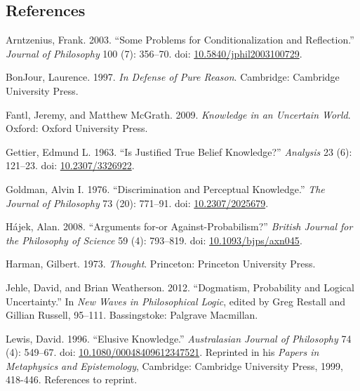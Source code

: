 \documentclass[
  10pt,
  letterpaper,
  DIV=11,
  numbers=noendperiod,
  twoside]{scrartcl}
\newlength{\cslhangindent}
\newenvironment{CSLReferences}[2] %
 {\begin{list}{}{%
  \setlength{\itemindent}{0pt}
  \setlength{\leftmargin}{0pt}
  \setlength{\parsep}{0pt}
  \ifodd #1
   \setlength{\leftmargin}{\cslhangindent}
   \setlength{\itemindent}{-1\cslhangindent}
  \fi
  \setlength{\itemsep}{#2\baselineskip}}}
 {\end{list}}
\begin{document}
\subsection*{References}\label{references}

\label{refs}
\begin{CSLReferences}{1}{0}
Arntzenius, Frank. 2003. {``Some Problems for Conditionalization and
Reflection.''} \emph{Journal of Philosophy} 100 (7): 356--70. doi:
\href{https://doi.org/10.5840/jphil2003100729}{10.5840/jphil2003100729}.

BonJour, Laurence. 1997. \emph{In Defense of Pure Reason}. Cambridge:
Cambridge University Press.

Fantl, Jeremy, and Matthew McGrath. 2009. \emph{Knowledge in an
Uncertain World}. Oxford: Oxford University Press.

Gettier, Edmund L. 1963. {``Is Justified True Belief Knowledge?''}
\emph{Analysis} 23 (6): 121--23. doi:
\href{https://doi.org/10.2307/3326922}{10.2307/3326922}.

Goldman, Alvin I. 1976. {``Discrimination and Perceptual Knowledge.''}
\emph{The Journal of Philosophy} 73 (20): 771--91. doi:
\href{https://doi.org/10.2307/2025679}{10.2307/2025679}.

Hájek, Alan. 2008. {``Arguments for-or Against-Probabilism?''}
\emph{British Journal for the Philosophy of Science} 59 (4): 793--819.
doi: \href{https://doi.org/10.1093/bjps/axn045}{10.1093/bjps/axn045}.

Harman, Gilbert. 1973. \emph{Thought}. Princeton: Princeton University
Press.

Jehle, David, and Brian Weatherson. 2012. {``Dogmatism, Probability and
Logical Uncertainty.''} In \emph{New Waves in Philosophical Logic},
edited by Greg Restall and Gillian Russell, 95--111. Bassingstoke:
Palgrave Macmillan.

Lewis, David. 1996. {``Elusive Knowledge.''} \emph{Australasian Journal
of Philosophy} 74 (4): 549--67. doi:
\href{https://doi.org/10.1080/00048409612347521}{10.1080/00048409612347521}.
Reprinted in his \emph{Papers in Metaphysics and Epistemology},
Cambridge: Cambridge University Press, 1999, 418-446. References to
reprint.


\end{CSLReferences}
\end{document}
